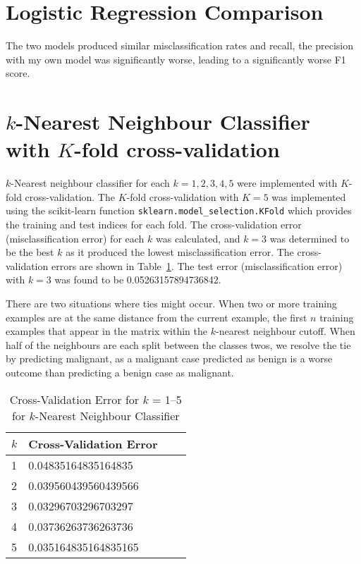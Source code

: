 \documentclass[12pt]{article}
\begin{document}
\section*{Logistic Regression Comparison}
The two models produced similar misclassification rates and recall, the precision with my own model was significantly worse, leading to a significantly worse F1 score.

\clearpage
\section*{$k$-Nearest Neighbour Classifier with $K$-fold cross-validation}
$k$-Nearest neighbour classifier for each $k = 1,2,3,4,5$ were implemented with $K$-fold cross-validation. The $K$-fold cross-validation with $K = 5$ was implemented using the scikit-learn function \texttt{sklearn.model\_selection.KFold} which provides the training and test indices for each fold. The cross-validation error (misclassification error) for each $k$ was calculated, and $k = 3$ was determined to be the best $k$ as it produced the lowest misclassification error. The cross-validation errors are shown in Table~\ref{tab:kneigh}. The test error (misclassification error) with $k = 3$ was found to be 0.05263157894736842.

There are two situations where ties might occur. When two or more training examples are at the same distance from the current example, the first $n$ training examples that appear in the matrix within the $k$-nearest neighbour cutoff. When half of the neighbours are each split between the classes twos, we resolve the tie by predicting malignant, as a malignant case predicted as  benign is a worse outcome than predicting a benign case as malignant.

\begin{table}[htp]
\centering
\caption{Cross-Validation Error for $k$ = 1--5 for $k$-Nearest Neighbour Classifier}\label{tab:kneigh}
\begin{tabular}{|l|l|l|l|}
	\hline
	$k$	& Cross-Validation Error	\\ \hline\hline
	1  	& 0.04835164835164835		\\ \hline
	2  	& 0.039560439560439566		\\ \hline
	3  	& 0.03296703296703297		\\ \hline
	4  	& 0.03736263736263736		\\ \hline
	5  	& 0.035164835164835165		\\ \hline
\end{tabular}
\end{table}
\end{document}
